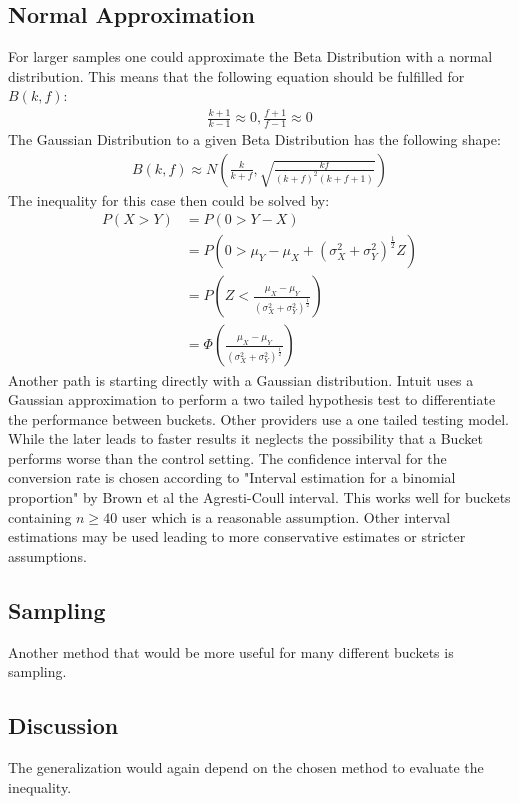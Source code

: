 \documentclass[../Thesis.tex]{subfiles}
\begin{document}
\subsection{Normal Approximation}
For larger samples one could approximate the Beta Distribution with a normal distribution. This means that the following equation should be fulfilled for $B(k,f)$:
\begin{align*}
\frac{k + 1}{k - 1}\approx 0,
\frac{f + 1}{f - 1}\approx 0
\end{align*}
The Gaussian Distribution to a given Beta Distribution has the following shape:
\begin{align*}
B(k,f)\approx N\left(\frac{k}{k+f},\sqrt{\frac{kf}{(k+f)^2(k+f+1)}} \right)
\end{align*}
The inequality for this case then could be solved by:
\begin{align*}
P(X>Y)	&= P(0 > Y - X) \\
			&= P(0 > \mu_Y - \mu_X + (\sigma_X^2 + \sigma_Y^2)^{\frac{1}{2}}Z) \\
			&= P\left(Z < \frac{\mu_X - \mu_Y}{(\sigma_X^2 + \sigma_Y^2)^{\frac{1}{2}}}\right) \\
			&= \Phi\left(\frac{\mu_X - \mu_Y}{(\sigma_X^2 + \sigma_Y^2)^{\frac{1}{2}}}\right)
\end{align*}
Another path is starting directly with a Gaussian distribution. Intuit uses a Gaussian approximation to perform a two tailed hypothesis test to differentiate the performance between buckets. Other providers use a one tailed testing model. While the later leads to faster results it neglects the possibility that a Bucket performs worse than the control setting.
The confidence interval for the conversion rate is chosen according to "Interval estimation for a binomial proportion" by Brown et al \cite{brown2001interval} the Agresti-Coull interval. This works well for buckets containing $n \geq 40$ user which is a reasonable assumption. Other interval estimations may be used leading to more conservative estimates or stricter assumptions.

\subsection{Sampling}
Another method that would be more useful for many different buckets is sampling.


\subsection{Discussion}
The generalization would again depend on the chosen method to evaluate the inequality.
\end{document}
